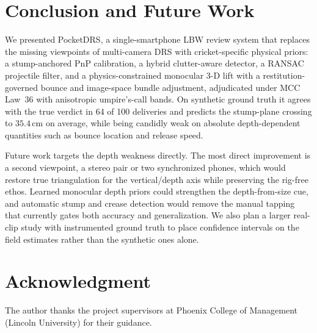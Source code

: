 \documentclass[journal]{IEEEtran}
\begin{document}
\section{Conclusion and Future Work}
\label{sec:conclusion}

We presented PocketDRS, a single-smartphone LBW review system that replaces the
missing viewpoints of multi-camera DRS with cricket-specific physical priors: a
stump-anchored PnP calibration, a hybrid clutter-aware detector, a RANSAC
projectile filter, and a physics-constrained monocular 3-D lift with a
restitution-governed bounce and image-space bundle adjustment, adjudicated under
MCC Law~36 with anisotropic umpire's-call bands. On synthetic ground truth it
agrees with the true verdict in 64 of 100 deliveries and predicts the
stump-plane crossing to $35.4$\,cm on average, while being candidly weak on
absolute depth-dependent quantities such as bounce location and release speed.

Future work targets the depth weakness directly. The most direct improvement is
a second viewpoint, a stereo pair or two synchronized phones, which would
restore true triangulation for the vertical/depth axis while preserving the
rig-free ethos. Learned monocular depth priors could strengthen the
depth-from-size cue, and automatic stump and crease detection would remove the
manual tapping that currently gates both accuracy and generalization. We also
plan a larger real-clip study with instrumented ground truth to place
confidence intervals on the field estimates rather than the synthetic ones
alone.

\section*{Acknowledgment}
The author thanks the project supervisors at Phoenix College of Management
(Lincoln University) for their guidance.
\end{document}
